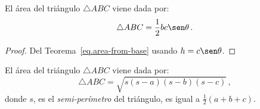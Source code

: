\begin{theorem} El área del triángulo $\triangle ABC$ viene dada por:
\begin{align}\label{eq.area-from-sine}
\triangle ABC = \frac{1}{2}bc\sen \theta\,.
\end{align}
\end{theorem}
\begin{proof} Del Teorema~\ref{eq.area-from-base} usando
$h=c\sen \theta$.
\end{proof}



\begin{theorem}[eron] El área del triángulo $\triangle ABC$ viene dada por:\label{thm.heron} 
\[
\triangle ABC = \sqrt{s(s-a)(s-b)(s-c)}\,,
\]
donde $s$, es el \emph{semi-perímetro} del triángulo, es igual a  $\frac{1}{2}(a+b+c)$.
\end{theorem}

